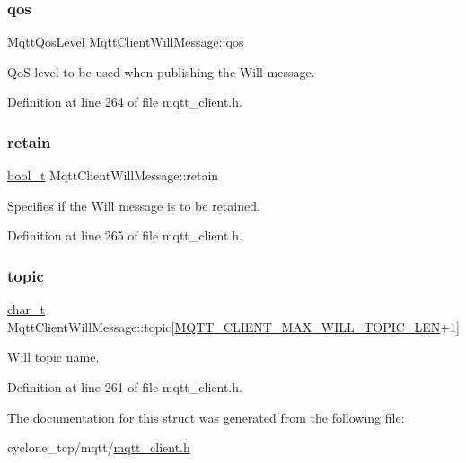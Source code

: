 \mbox{\label{structMqttClientWillMessage_acd54a5da3775c6207a49abf737782cf3}} 
\subsubsection{\texorpdfstring{qos}{qos}}
{\footnotesize\ttfamily \hyperlink{mqtt__common_8h_a79ec1e304b7f2ed51b12f489f642f0bb}{Mqtt\+Qos\+Level} Mqtt\+Client\+Will\+Message\+::qos}



QoS level to be used when publishing the Will message. 



Definition at line 264 of file mqtt\+\_\+client.\+h.

\mbox{\label{structMqttClientWillMessage_a3f803c4c50217dc7205ca4e95c9303f7}} 
\subsubsection{\texorpdfstring{retain}{retain}}
{\footnotesize\ttfamily \hyperlink{compiler__port_8h_a812d16e5494522586b3784e55d479912}{bool\+\_\+t} Mqtt\+Client\+Will\+Message\+::retain}



Specifies if the Will message is to be retained. 



Definition at line 265 of file mqtt\+\_\+client.\+h.

\mbox{\label{structMqttClientWillMessage_ab15e9ab89804063a8f96bfef47861bcd}} 
\subsubsection{\texorpdfstring{topic}{topic}}
{\footnotesize\ttfamily \hyperlink{compiler__port_8h_a40bb5262bf908c328fbcfbe5d29d0201}{char\+\_\+t} Mqtt\+Client\+Will\+Message\+::topic\mbox{[}\hyperlink{mqtt__client_8h_ac413355c9b321681ee436457ed50d6c9}{M\+Q\+T\+T\+\_\+\+C\+L\+I\+E\+N\+T\+\_\+\+M\+A\+X\+\_\+\+W\+I\+L\+L\+\_\+\+T\+O\+P\+I\+C\+\_\+\+L\+EN}+1\mbox{]}}



Will topic name. 



Definition at line 261 of file mqtt\+\_\+client.\+h.



The documentation for this struct was generated from the following file\+:\begin{DoxyCompactItemize}
\item 
cyclone\+\_\+tcp/mqtt/\hyperlink{mqtt__client_8h}{mqtt\+\_\+client.\+h}\end{DoxyCompactItemize}
